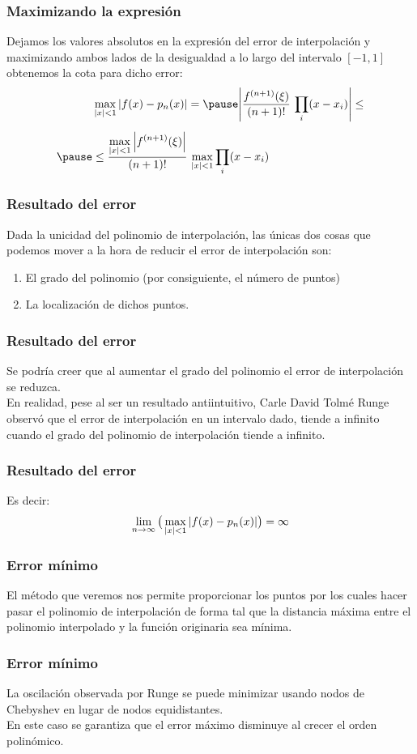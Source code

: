 \documentclass[12pt]{beamer}
\begin{document}
\begin{frame}
\frametitle{Maximizando la expresión}
Dejamos los valores absolutos en la expresión del error de interpolación y maximizando ambos lados de la desigualdad a lo largo del intervalo $[-1, 1]$ obtenemos la cota para dicho error:
\pause
\begin{eqnarray*}
\begin{aligned}
&\max_{\abs{x} < 1} \abs{f(x) - p_{n}(x)} = \pause \abs{\dfrac{f^{(n+1)}(\xi)}{(n + 1)!} \, \prod_{i} (x - x_{i})} \leq \\[0.5em] \pause
&\leq \dfrac{\displaystyle \max_{\abs{x} < 1} \abs{f^{(n+1)}(\xi)}}{(n+1)!} \, \max_{\abs{x} < 1} \prod_{i} (x - x_{i})
\end{aligned}
\end{eqnarray*}
\end{frame}
\begin{frame}
\frametitle{Resultado del error}
Dada la unicidad del polinomio de interpolación, las únicas dos cosas que podemos mover a la hora de reducir el error de interpolación son:
\begin{enumerate}[<+->]
\item El grado del polinomio (por consiguiente, el número de puntos)
\item La localización de dichos puntos.
\end{enumerate}
\end{frame}
\begin{frame}
\frametitle{Resultado del error}
Se podría creer que al aumentar el grado del polinomio el error de interpolación se reduzca. 
\\
\bigskip
\pause
En realidad, pese al ser un resultado antiintuitivo, Carle David Tolmé Runge observó que el error de interpolación en un intervalo dado, tiende a infinito cuando el grado del polinomio de interpolación tiende a infinito.
\end{frame}
\begin{frame}
\frametitle{Resultado del error}
Es decir:
\pause
\begin{align*}
\lim_{n \to \infty} \big( \max_{\abs{x} < 1} \abs{f(x) - p_{n}(x)} \big) = \infty
\end{align*}
\end{frame}
\begin{frame}
\frametitle{Error mínimo}
El método que veremos nos permite proporcionar los puntos por los cuales hacer pasar el polinomio de interpolación de forma tal que la distancia máxima entre el polinomio interpolado y la función originaria sea mínima.
\end{frame}
\begin{frame}
\frametitle{Error mínimo}
La oscilación observada por Runge se puede minimizar usando nodos de Chebyshev en lugar de nodos equidistantes.
\\
\bigskip
\pause
En este caso se garantiza que el error máximo disminuye al crecer el orden polinómico.
\end{frame}
\end{document}
